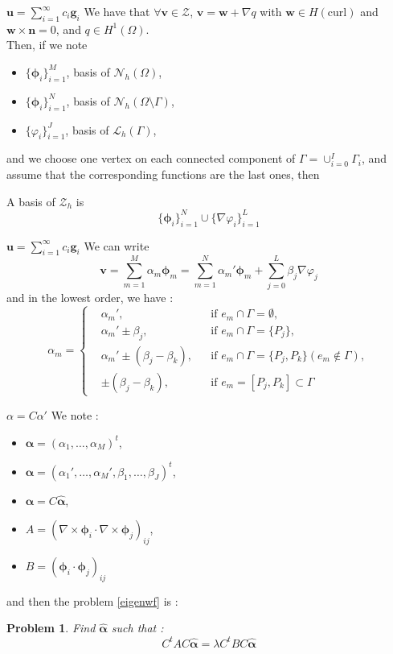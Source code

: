 \documentclass{beamer}
\newtheorem{pb}{Problem}
\newcommand{\Z}{{\bm{\mathcal{Z}}}}
\newcommand{\NN}{{\bm{\mathcal{N}}}}
\newcommand{\LLL}{{\bm{\mathcal{L}}}}
\newcommand{\curl}{{\nabla\times}}
\begin{document}
\begin{frame}{$\mathbf{u}=\sum_{i=1}^\infty c_i\mathbf{g}_i$}
  We have that $\forall\mathbf{v}\in\Z$, $\mathbf{v}=\mathbf{w}+\nabla q$ with $\mathbf{w}\in H(\mathrm{curl})$ and $\mathbf{w}\times\mathbf{n}=0$, and $q \in H^1(\Omega)$.\\
  Then, if we note
  \begin{itemize}
  \item $\{\bm{\phi}_i\}_{i=1}^M$, basis of $\NN_h(\Omega)$,
  \item $\{\bm{\phi}_i\}_{i=1}^N$, basis of $\NN_h(\Omega\setminus\Gamma)$,
  \item $\{\varphi_i\}_{i=1}^J$, basis of $\LLL_h(\Gamma)$,
  \end{itemize}
  and we choose one vertex on each connected component of $\Gamma=\cup_{i=0}^I\Gamma_i$, and assume that the corresponding functions are the last ones, then
  \begin{block}{A basis of $\Z_h$ is}
    \[ \{\bm{\phi}_i\}_{i=1}^N\cup\{\nabla\varphi_i\}_{i=1}^L \]
  \end{block}
\end{frame}

\begin{frame}{$\mathbf{u}=\sum_{i=1}^\infty c_i\mathbf{g}_i$}
  We can write
  \[ \mathbf{v}=\sum_{m=1}^M\alpha_m\bm{\phi}_m=\sum_{m=1}^N\alpha_m'\bm{\phi}_m+ \sum_{j=0}^L \beta_j\nabla\varphi_j \]
  and in the lowest order, we have :
  \[
  \alpha_m=\left\{\begin{aligned}
  &\alpha_m', &&\mbox{if } e_m\cap\Gamma = \emptyset,\\
  &\alpha_m'\pm \beta_j, &&\mbox{if } e_m\cap\Gamma = \{P_j\},\\
  &\alpha_m'\pm (\beta_j-\beta_k), &&\mbox{if } e_m\cap\Gamma = \{P_j,P_k\}
  (e_m\notin\Gamma),\\
  &\pm (\beta_j-\beta_k), &&\mbox{if } e_m=[P_j,P_k]\subset\Gamma
  \end{aligned}\right.
  \]
\end{frame}

\begin{frame}{$\alpha=C\alpha'$}
  We note :
  \begin{itemize}
  \item $\bm{\alpha}=(\alpha_1,\dots,\alpha_M)^t$,
  \item $\widehat{\bm{\alpha}}=(\alpha_1',\dots,\alpha_M',\beta_1,\dots,\beta_J)^t$,
  \item $\bm{\alpha} = C\widehat{\bm{\alpha}}$,
  \item $A=(\curl\bm{\phi}_i\cdot\curl\bm{\phi}_j)_{ij}$,
  \item $B=(\bm{\phi}_i\cdot\bm{\phi}_j)_{ij}$
  \end{itemize}
  and then the problem \ref{eigenwf} is :
  \begin{pb}
    Find $\widehat{\bm{\alpha}}$ such that :
    \[ C^tAC\widehat{\bm{\alpha}}=\lambda C^tBC\widehat{\bm{\alpha}} \]
  \end{pb}
\end{frame}
\end{document}
